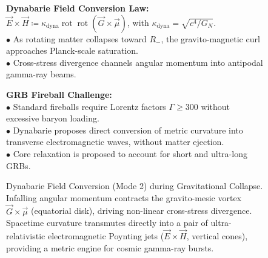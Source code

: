 \documentclass[
    12pt,
    a4paper,
    headings=normal,
    twoside=false,
    open=any,
    parskip=half
]{scrbook}
\begin{document}
\begin{figure}[htbp]
\par\vspace{2mm}
\begin{tcolorbox}[colback=white, colframe=secondarycolor!70, arc=2mm, boxrule=0.7pt, left=6pt, right=6pt, top=4pt, bottom=4pt, width=\linewidth]
\scriptsize\sffamily
\begin{minipage}[t]{0.48\textwidth}
  \textbf{\color{maincolor}Dynabarie Field Conversion Law:}\\[1pt]
  $\vec{E} \times \vec{H} \coloneqq \kappa_{\text{dyna}}\operatorname{rot}\operatorname{rot}(\vec{G} \times \vec{\mu})$, with $\kappa_{\text{dyna}}=\sqrt{c^4/G_N}$.\\[2pt]
  $\bullet$ As rotating matter collapses toward $R_-$, the gravito-magnetic curl approaches Planck-scale saturation.\\[1pt]
  $\bullet$ Cross-stress divergence channels angular momentum into antipodal gamma-ray beams.
\end{minipage}\hfill
\begin{minipage}[t]{0.48\textwidth}
  \textbf{\color{accentcolor}GRB Fireball Challenge:}\\[1pt]
  $\bullet$ Standard fireballs require Lorentz factors $\Gamma\ge300$ without excessive baryon loading.\\[1pt]
  $\bullet$ Dynabarie proposes direct conversion of metric curvature into transverse electromagnetic waves, without matter ejection.\\[1pt]
  $\bullet$ Core relaxation is proposed to account for short and ultra-long GRBs.
\end{minipage}
\end{tcolorbox}
\caption{Dynabarie Field Conversion (Mode 2) during Gravitational Collapse. Infalling angular momentum contracts the gravito-mesic vortex $\vec{G} \times \vec{\mu}$ (equatorial disk), driving non-linear cross-stress divergence. Spacetime curvature transmutes directly into a pair of ultra-relativistic electromagnetic Poynting jets ($\vec{E} \times \vec{H}$, vertical cones), providing a metric engine for cosmic gamma-ray bursts.}
\label{fig:ch6_dynabarie_grb_conversion}
\end{figure}
\end{document}
